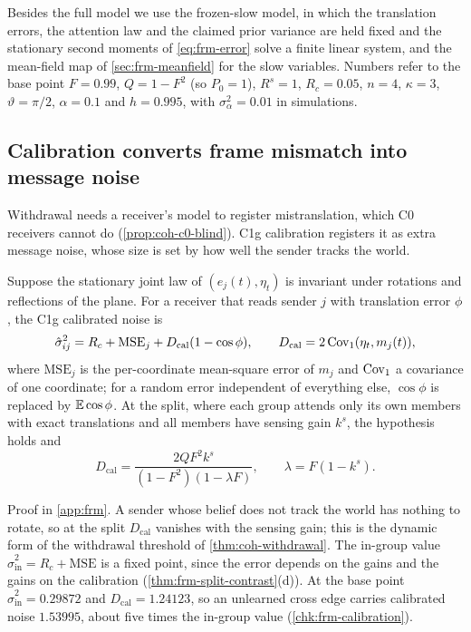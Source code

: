 Besides the full model we use the frozen-slow model, in which the translation errors, the attention law and the claimed prior variance are held fixed and the stationary second moments of \eqref{eq:frm-error} solve a finite linear system, and the mean-field map of \cref{sec:frm-meanfield} for the slow variables. Numbers refer to the base point $F=0.99$, $Q=1-F^2$ (so $P_0=1$), $R^s=1$, $R_c=0.05$, $n=4$, $\kappa=3$, $\vartheta=\pi/2$, $\alpha=0.1$ and $h=0.995$, with $\sigma_\alpha^2=0.01$ in simulations.

\subsection{Calibration converts frame mismatch into message noise}\label{sec:frm-calibration}

Withdrawal needs a receiver's model to register mistranslation, which C0 receivers cannot do (\cref{prop:coh-c0-blind}). C1g calibration registers it as extra message noise, whose size is set by how well the sender tracks the world.

\begin{lemma}\label{lem:frm-calibration}
Suppose the stationary joint law of $(e_j(t),\eta_t)$ is invariant under rotations and reflections of the plane. For a receiver that reads sender $j$ with translation error $\phi$, the C1g calibrated noise is
\begin{equation}\label{eq:frm-calibration}
\hat\sigma^2_{ij}=R_c+\mathrm{MSE}_j+D_{\mathrm{cal}}(1-\cos\phi),\qquad D_{\mathrm{cal}}=2\operatorname{Cov}_1(\eta_t,m_j(t)),
\end{equation}
where $\mathrm{MSE}_j$ is the per-coordinate mean-square error of $m_j$ and $\operatorname{Cov}_1$ a covariance of one coordinate; for a random error independent of everything else, $\cos\phi$ is replaced by $\mathbb{E}\cos\phi$. At the split, where each group attends only its own members with exact translations and all members have sensing gain $k^s$, the hypothesis holds and
\begin{equation*}
D_{\mathrm{cal}}=\frac{2QF^2k^s}{(1-F^2)(1-\lambda F)},\qquad\lambda=F(1-k^s).
\end{equation*}
\end{lemma}
Proof in \cref{app:frm}. A sender whose belief does not track the world has nothing to rotate, so at the split $D_{\mathrm{cal}}$ vanishes with the sensing gain; this is the dynamic form of the withdrawal threshold of \cref{thm:coh-withdrawal}. The in-group value $\hat\sigma^2_{\mathrm{in}}=R_c+\mathrm{MSE}$ is a fixed point, since the error depends on the gains and the gains on the calibration (\cref{thm:frm-split-contrast}(d)). At the base point $\hat\sigma^2_{\mathrm{in}}=0.29872$ and $D_{\mathrm{cal}}=1.24123$, so an unlearned cross edge carries calibrated noise $1.53995$, about five times the in-group value (\cref{chk:frm-calibration}).

